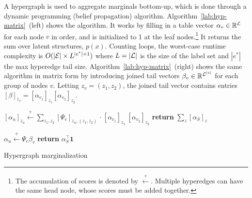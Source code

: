 \documentclass{article}
\begin{document}
A hypergraph is used to aggregate marginals bottom-up, which is done through a dynamic programming (belief propagation) algorithm. 
Algorithm~\ref{lab:hyp-matrix}~(left) shows the algorithm. It works by filling in a table vector 
$\alpha_v \in \mathbb{R}^{\mathcal{L}}$ for each node $v$ in order, and is initialized to 1 at the leaf nodes.\footnote{
The accumulation of scores is denoted by $\stackrel{+}{\gets}$.
Multiple hyperedges can have the same head node, whose scores must be added together.}
It returns the sum over latent structures, $p(x)$. Counting
loops, the worst-case runtime complexity is
$O(|{\cal E}|\times L^{|e^*|+1})$ where $L = |{\cal L}|$ is the size of the
label set and $|e^*|$ the max hyperedge tail size. Algorithm~\ref{lab:hyp-matrix}~(right) shows the 
same algorithm in matrix form by introducing joined tail vectors $\beta_v\in\mathbb{R}^{\mathcal{L}^{|e|}}$ for each group of nodes $v$.  Letting $z_v = (z_1,z_2)$, the joined tail vector contains entries $[\beta]_{z_v} = [\alpha_{v_1}]_{z_1}[\alpha_{v_2}]_{z_2}$.

\begin{algorithm}[t]
\begin{minipage}[t]{0.50\textwidth}
\begin{algorithmic} 
\STATE $[\alpha_u]_{z_u} \stackrel{+}{\gets}  \sum_{z_1, z_2}  [\Psi_e]_{z_u,(z_1, z_2)}$
\STATE \hspace{7em} $\bm\cdot \ [\alpha_{v_1}]_{z_1} \  [\alpha_{v_2}]_{z_2}$
\ENDFOR
\ENDFOR
\STATE \textbf{return} $\sum_z [\alpha_S]_z$
\end{algorithmic}
\end{minipage}
\begin{minipage}[t]{0.45\textwidth}
\begin{algorithmic} 
\STATE $\alpha_u \stackrel{+}{\gets} \Psi_e\beta_v$
\ENDFOR
\STATE \textbf{return} $\alpha_S^\top \mathbf{1}$

\vspace{1.5em}
\end{algorithmic}
\end{minipage}
\caption{\label{lab:hyp-matrix} Hypergraph marginalization }
\end{algorithm}
\end{document}
